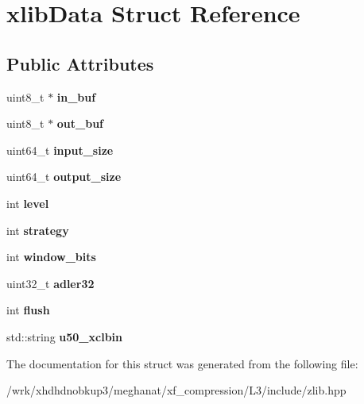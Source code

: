 \hypertarget{structxlibData}{\section{xlib\-Data Struct Reference}
\label{structxlibData}
}
\subsection*{Public Attributes}
\begin{DoxyCompactItemize}
\item 
\hypertarget{structxlibData_a25a95929b7546db2cd5f0dcac955c398}{uint8\-\_\-t $\ast$ {\bfseries in\-\_\-buf}}\label{structxlibData_a25a95929b7546db2cd5f0dcac955c398}

\item 
\hypertarget{structxlibData_affe6e84a5b174855692304be6c373e25}{uint8\-\_\-t $\ast$ {\bfseries out\-\_\-buf}}\label{structxlibData_affe6e84a5b174855692304be6c373e25}

\item 
\hypertarget{structxlibData_a7a176e85c1843a722fa47cb82d759b07}{uint64\-\_\-t {\bfseries input\-\_\-size}}\label{structxlibData_a7a176e85c1843a722fa47cb82d759b07}

\item 
\hypertarget{structxlibData_ad4e9193559fc872f3ed148ddb3b32062}{uint64\-\_\-t {\bfseries output\-\_\-size}}\label{structxlibData_ad4e9193559fc872f3ed148ddb3b32062}

\item 
\hypertarget{structxlibData_ae9403a54b065162b97a38588e85bc32f}{int {\bfseries level}}\label{structxlibData_ae9403a54b065162b97a38588e85bc32f}

\item 
\hypertarget{structxlibData_a80237a47cdb64fe118a8b6eb34c45e07}{int {\bfseries strategy}}\label{structxlibData_a80237a47cdb64fe118a8b6eb34c45e07}

\item 
\hypertarget{structxlibData_a822c511d79a90b76ac605299260e7ded}{int {\bfseries window\-\_\-bits}}\label{structxlibData_a822c511d79a90b76ac605299260e7ded}

\item 
\hypertarget{structxlibData_a60f13588ad585222601a2bcac3380ab0}{uint32\-\_\-t {\bfseries adler32}}\label{structxlibData_a60f13588ad585222601a2bcac3380ab0}

\item 
\hypertarget{structxlibData_a9c4814f8637fa6929fcc40f3632908d5}{int {\bfseries flush}}\label{structxlibData_a9c4814f8637fa6929fcc40f3632908d5}

\item 
\hypertarget{structxlibData_a357a9a7ecd00182a9aa6c9f1222221ba}{std\-::string {\bfseries u50\-\_\-xclbin}}\label{structxlibData_a357a9a7ecd00182a9aa6c9f1222221ba}

\end{DoxyCompactItemize}


The documentation for this struct was generated from the following file\-:\begin{DoxyCompactItemize}
\item 
/wrk/xhdhdnobkup3/meghanat/xf\-\_\-compression/\-L3/include/zlib.\-hpp\end{DoxyCompactItemize}
